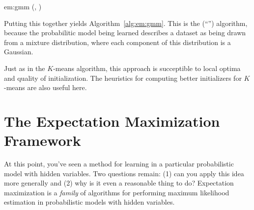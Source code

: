 \newalgorithm%
  {em:gmm}%
  {(, )}
  {
 
 
 
\ENDFOR
\REPEAT
{}
\ENDFOR
{}
\ENDFOR
{}
\ENDFOR
{}
\RETURN {} 
}

Putting this together yields Algorithm~\ref{alg:em:gmm}.  This is the
 (``'') algorithm,
because the probabilitic model being learned describes a dataset as
being drawn from a mixture distribution, where each component of this
distribution is a Gaussian.


Just as in the $K$-means algorithm, this approach is succeptible to
local optima and quality of initialization.  The heuristics for
computing better initializers for $K$-means are also useful here.

\section{The Expectation Maximization Framework}

At this point, you've seen a method for learning in a particular
probabilistic model with hidden variables.  Two questions remain: (1)
can you apply this idea more generally and (2) why is it even a
reasonable thing to do?  Expectation maximization is a \emph{family}
of algorithms for performing maximum likelihood estimation in
probabilistic models with hidden variables.

